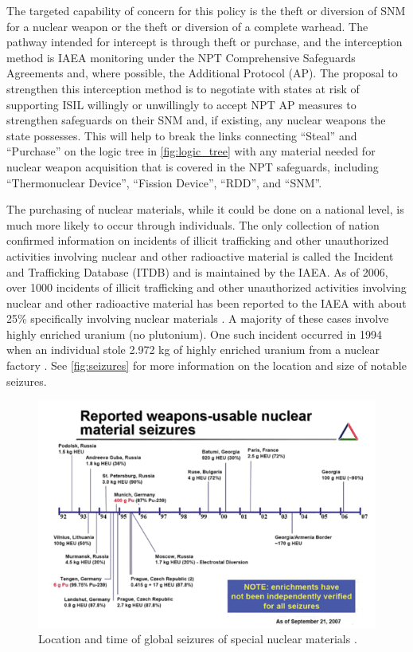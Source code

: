 \documentclass{report}
\begin{document}
The targeted capability of concern for this policy is the theft or diversion of SNM for a nuclear weapon or the theft or diversion of a complete warhead. The pathway intended for intercept is through theft or purchase, and the interception method is IAEA monitoring under the NPT Comprehensive Safeguards Agreements and, where possible, the Additional Protocol (AP). The proposal to strengthen this interception method is to negotiate with states at risk of supporting ISIL willingly or unwillingly to accept NPT AP measures to strengthen safeguards on their SNM and, if existing, any nuclear weapons the state possesses. This will help to break the links connecting \enquote{Steal} and \enquote{Purchase} on the logic tree in \autoref{fig:logic_tree} with any material needed for nuclear weapon acquisition that is covered in the NPT safeguards, including \enquote{Thermonuclear Device}, \enquote{Fission Device}, \enquote{RDD}, and \enquote{SNM}. 



The purchasing of nuclear materials, while it could be done on a national level, is much more likely to occur through individuals. The only collection of nation confirmed information on incidents of illicit trafficking and other unauthorized activities involving nuclear and other radioactive material is called the Incident and Trafficking Database (ITDB) and is maintained by the IAEA. As of 2006, over 1000 incidents of illicit trafficking and other unauthorized activities involving nuclear and other radioactive material has been reported to the IAEA with about 25\% specifically involving nuclear materials \cite{Iaea2007}. A majority of these cases involve highly enriched uranium (no plutonium). One such incident occurred in 1994 when an individual stole 2.972 kg of highly enriched uranium from a nuclear factory \cite{Iaea2007}. See \autoref{fig:seizures} for more information on the location and size of notable seizures. 

\begin{figure}
 \centering
 \includegraphics[trim = 0cm 0cm 0cm 0cm, clip,scale=0.7]{./figures/seizures.png}
   \caption{Location and time of global seizures of special nuclear materials \cite{Muller2007}.}
     \label{fig:seizures}
\end{figure}
\end{document}
